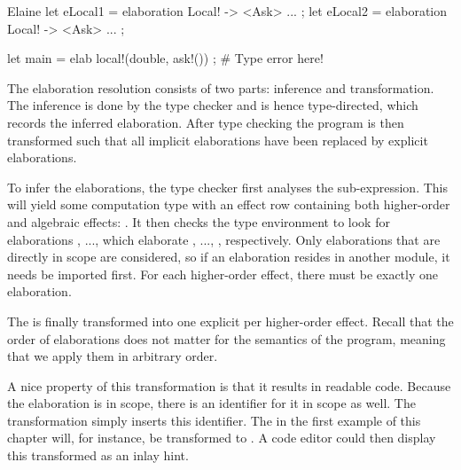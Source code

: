 \begin{lst}{Elaine}
let eLocal1 = elaboration Local! -> <Ask> { ... };
let eLocal2 = elaboration Local! -> <Ask> { ... };

let main = elab { local!(double, ask!()) }; # Type error here!
\end{lst}
%
The elaboration resolution consists of two parts: inference and transformation. The inference is done by the type checker and is hence type-directed, which records the inferred elaboration. After type checking the program is then transformed such that all implicit elaborations have been replaced by explicit elaborations.

To infer the elaborations, the type checker first analyses the sub-expression. This will yield some computation type with an effect row containing both higher-order and algebraic effects: . It then checks the type environment to look for elaborations , ...,  which elaborate , ..., , respectively. Only elaborations that are directly in scope are considered, so if an elaboration resides in another module, it needs be imported first. For each higher-order effect, there must be exactly one elaboration.

The  is finally transformed into one explicit  per higher-order effect. Recall that the order of elaborations does not matter for the semantics of the program, meaning that we apply them in arbitrary order.

A nice property of this transformation is that it results in readable code. Because the elaboration is in scope, there is an identifier for it in scope as well. The transformation simply inserts this identifier. The \elab in the first example of this chapter will, for instance, be transformed to . A code editor could then display this transformed  as an inlay hint.
